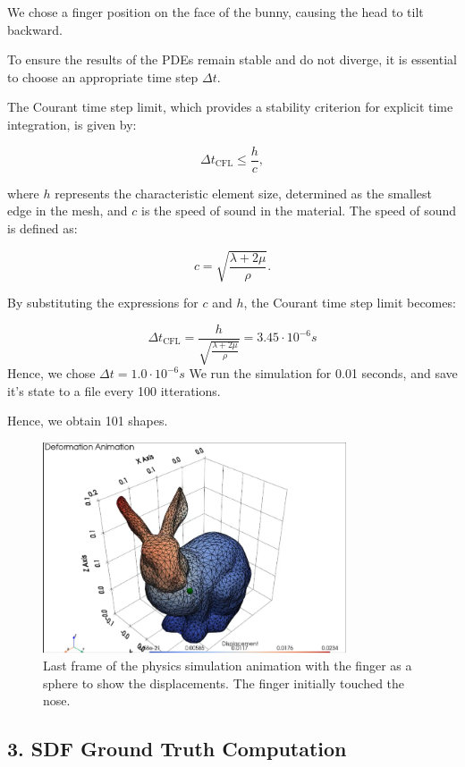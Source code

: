 \documentclass[a4paper,12pt]{article}
\begin{document}
We chose a finger position on the face of the bunny, causing the head to tilt backward.

\newpage
To ensure the results of the PDEs remain stable and do not diverge, it is essential to choose an appropriate time step \( \Delta t \).

The Courant time step limit, which provides a stability criterion for explicit time integration, is given by:

\[
	\Delta t_{\text{CFL}} \leq \frac{h}{c},
\]

where \( h \) represents the characteristic element size, determined as the smallest edge in the mesh, and \( c \) is the speed of sound in the material. The speed of sound is defined as:

\[
	c = \sqrt{\frac{\lambda + 2\mu}{\rho}}.
\]

By substituting the expressions for \( c \) and \( h \), the Courant time step limit becomes:

\[
	\Delta t_{\text{CFL}} = \frac{h}{\sqrt{\frac{\lambda + 2\mu}{\rho}}} = 3.45 \cdot 10 ^{-6}s
\]
Hence, we chose $\Delta t = 1.0\cdot10^{-6}s$
We run the simulation for 0.01 seconds, and save it's state to a file every 100 itterations.

Hence, we obtain 101 shapes.

\begin{figure}[h!]
	\centering
	\includegraphics[width=0.8\textwidth]{proj/2-deformation-animation.png}
	\caption{Last frame of the physics simulation animation with the finger as a sphere to show the displacements. The finger initially touched the nose. }
	\label{fig:physics-animation-bunny}
\end{figure}

\subsection*{3. SDF Ground Truth Computation}
\end{document}
